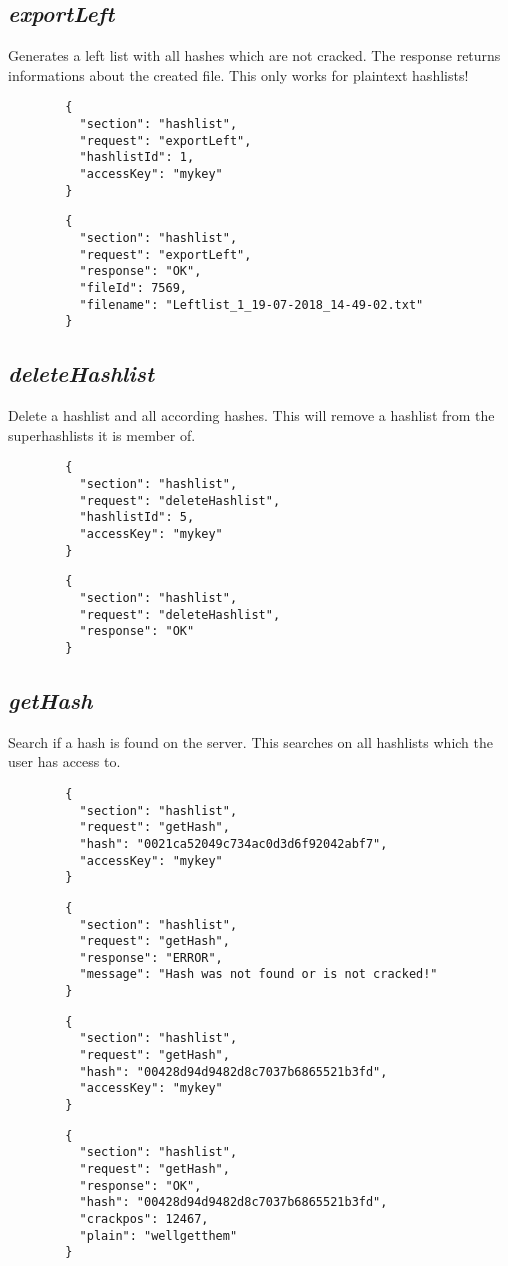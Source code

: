 \subsection*{\textit{exportLeft}}
	Generates a left list with all hashes which are not cracked. The response returns informations about the created file. This only works for plaintext hashlists!
	{
		\color{blue}
		\begin{verbatim}
		{
		  "section": "hashlist",
		  "request": "exportLeft",
		  "hashlistId": 1,
		  "accessKey": "mykey"
		}
		\end{verbatim}
	}
	{
		\color{OliveGreen}
		\begin{verbatim}
		{
		  "section": "hashlist",
		  "request": "exportLeft",
		  "response": "OK",
		  "fileId": 7569,
		  "filename": "Leftlist_1_19-07-2018_14-49-02.txt"
		}
		\end{verbatim}
	}
\subsection*{\textit{deleteHashlist}}
	Delete a hashlist and all according hashes. This will remove a hashlist from the superhashlists it is member of.
	{
		\color{blue}
		\begin{verbatim}
		{
		  "section": "hashlist",
		  "request": "deleteHashlist",
		  "hashlistId": 5,
		  "accessKey": "mykey"
		}
		\end{verbatim}
	}
	{
		\color{OliveGreen}
		\begin{verbatim}
		{
		  "section": "hashlist",
		  "request": "deleteHashlist",
		  "response": "OK"
		}
		\end{verbatim}
	}
\subsection*{\textit{getHash}}
	Search if a hash is found on the server. This searches on all hashlists which the user has access to.
	{
		\color{blue}
		\begin{verbatim}
		{
		  "section": "hashlist",
		  "request": "getHash",
		  "hash": "0021ca52049c734ac0d3d6f92042abf7",
		  "accessKey": "mykey"
		}
		\end{verbatim}
	}
	{
		\color{OliveGreen}
		\begin{verbatim}
		{
		  "section": "hashlist",
		  "request": "getHash",
		  "response": "ERROR",
		  "message": "Hash was not found or is not cracked!"
		}
		\end{verbatim}
	}
	{
		\color{blue}
		\begin{verbatim}
		{
		  "section": "hashlist",
		  "request": "getHash",
		  "hash": "00428d94d9482d8c7037b6865521b3fd",
		  "accessKey": "mykey"
		}
		\end{verbatim}
	}
	{
		\color{OliveGreen}
		\begin{verbatim}
		{
		  "section": "hashlist",
		  "request": "getHash",
		  "response": "OK",
		  "hash": "00428d94d9482d8c7037b6865521b3fd",
		  "crackpos": 12467,
		  "plain": "wellgetthem"
		}
		\end{verbatim}
	}
